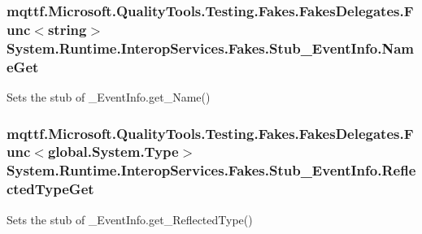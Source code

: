 \hypertarget{class_system_1_1_runtime_1_1_interop_services_1_1_fakes_1_1_stub___event_info_a241f831bb177197e4a19c5263b6f5f68}{
\subsubsection[{Name\-Get}]{\setlength{\rightskip}{0pt plus 5cm}mqttf.\-Microsoft.\-Quality\-Tools.\-Testing.\-Fakes.\-Fakes\-Delegates.\-Func$<$string$>$ System.\-Runtime.\-Interop\-Services.\-Fakes.\-Stub\-\_\-\-Event\-Info.\-Name\-Get}}\label{class_system_1_1_runtime_1_1_interop_services_1_1_fakes_1_1_stub___event_info_a241f831bb177197e4a19c5263b6f5f68}


Sets the stub of \-\_\-\-Event\-Info.\-get\-\_\-\-Name()

\hypertarget{class_system_1_1_runtime_1_1_interop_services_1_1_fakes_1_1_stub___event_info_a35e691c6505c3964c896e2bb22aa57b4}{
\subsubsection[{Reflected\-Type\-Get}]{\setlength{\rightskip}{0pt plus 5cm}mqttf.\-Microsoft.\-Quality\-Tools.\-Testing.\-Fakes.\-Fakes\-Delegates.\-Func$<$global.\-System.\-Type$>$ System.\-Runtime.\-Interop\-Services.\-Fakes.\-Stub\-\_\-\-Event\-Info.\-Reflected\-Type\-Get}}\label{class_system_1_1_runtime_1_1_interop_services_1_1_fakes_1_1_stub___event_info_a35e691c6505c3964c896e2bb22aa57b4}


Sets the stub of \-\_\-\-Event\-Info.\-get\-\_\-\-Reflected\-Type()

